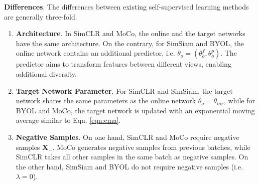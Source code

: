 \documentclass[11pt]{article}
\begin{document}
\textbf{Differences}. The differences between existing self-supervised learning methods are generally three-fold. 
\begin{enumerate}
    \item \textbf{Architecture}. In SimCLR and MoCo, the online and the target networks have the same architecture. On the contrary, for SimSiam and BYOL, the online network contains an additional predictor, i.e. $\theta_o = (\theta_o^f, \theta_o^p)$. The predictor aims to transform features between different views, enabling additional diversity. 
    \item \textbf{Target Network Parameter}. For SimCLR and SimSiam, the target network shares the same parameters as the online network $\theta_o=\theta_{tar}$, while for BYOL and MoCo, the target network is updated with an exponential moving average similar to Eqn. \ref{eqn:ema}.
    \item \textbf{Negative Samples}. On one hand, SimCLR and MoCo require negative samples $\mathbf{X}_-$. MoCo generates negative samples from previous batches, while SimCLR takes all other samples in the same batch as negative samples. On the other hand, SimSiam and BYOL do not require negative samples (i.e. $\lambda = 0$). 
\end{enumerate}
\end{document}
